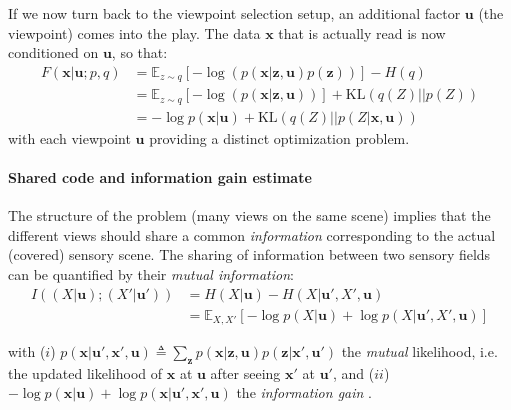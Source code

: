 \documentclass{article}
\begin{document}
If we now turn back to the viewpoint selection setup, an additional factor $\boldsymbol{u}$ (the viewpoint) comes into the play. The data $\boldsymbol{x}$ that is actually read is now conditioned on  $\boldsymbol{u}$, so that:
\begin{align}
F(\boldsymbol{x}|\boldsymbol{u};p,q) 
&= \mathbb{E}_{z\sim q} \left[-\log (p(\boldsymbol{x}|\boldsymbol{z},\boldsymbol{u})p(\boldsymbol{z}))\right] - H(q)\\
&= \mathbb{E}_{z\sim q} \left[-\log (p(\boldsymbol{x}|\boldsymbol{z},\boldsymbol{u}))\right] +\text{KL}(q(Z)||p(Z))
\label{eq:FEP-prior-u}\\
&= - \log p(\boldsymbol{x}|\boldsymbol{u}) + \text{KL}(q(Z)||p(Z|\boldsymbol{x}, \boldsymbol{u}))
\label{eq:FEP-posterior-u}\end{align}
with each viewpoint $\boldsymbol{u}$ providing a distinct optimization problem. 

\paragraph{Shared code and information gain estimate}

The structure of the problem (many views on the same scene) implies that the different  views should share a common \emph{information} corresponding to the actual (covered) sensory scene. The sharing of information between two sensory fields can be quantified by their \emph{mutual information}:
\begin{align}
I((X| \boldsymbol{u}); (X'| \boldsymbol{u}')) &= H(X| \boldsymbol{u}) - H(X| \boldsymbol{u}', X', \boldsymbol{u})\\
&= \mathbb{E}_{X,X'} \left[-\log p(X| \boldsymbol{u}) + \log p(X| \boldsymbol{u}', X', \boldsymbol{u})\right] \nonumber
\end{align}

with 
($i$) $ p(\boldsymbol{x}| \boldsymbol{u}', \boldsymbol{x}', \boldsymbol{u}) \triangleq \sum_{\boldsymbol{z}} p(\boldsymbol{x}|\boldsymbol{z}, \boldsymbol{u}) p(\boldsymbol{z}|\boldsymbol{x}', \boldsymbol{u}')$ 
the \emph{mutual} likelihood, i.e. the updated likelihood of $\boldsymbol{x}$ at $\boldsymbol{u}$ after seeing $\boldsymbol{x}'$ at $\boldsymbol{u}'$,
and ($ii$) 
$-\log p(\boldsymbol{x}| \boldsymbol{u}) + \log p(\boldsymbol{x}| \boldsymbol{u}', \boldsymbol{x}', \boldsymbol{u})$ the 
\emph{information gain} \citep{tishby2011information}.
\end{document}
